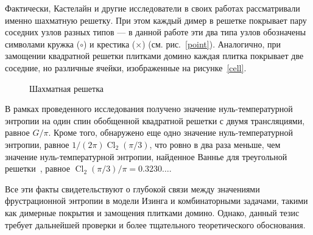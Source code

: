 \documentclass[utf8,12pt]{jetp}
\DeclareMathOperator{\Cl}{Cl}
\begin{document}
Фактически, Кастелайн и другие исследователи в своих работах рассматривали именно шахматную решетку. При этом каждый димер в решетке покрывает пару соседних узлов разных типов — в данной работе эти два типа узлов обозначены символами кружка ($\circ$) и крестика ($\times$) (см. рис.~\ref{point}). Аналогично, при замощении квадратной решетки плитками домино каждая плитка покрывает две соседние, но различные ячейки, изображенные на рисунке~\ref{cell}.

\begin{figure}[h]
	\caption{Шахматная решетка}
	\label{chessLattice}
\end{figure}

В рамках проведенного исследования получено значение нуль-температурной энтропии на один спин обобщенной квадратной решетки с двумя трансляциями, равное $G/\pi$. Кроме того, обнаружено еще одно значение нуль-температурной энтропии, равное $1/(2\pi)\Cl_2(\pi/3)$, что ровно в два раза меньше, чем значение нуль-температурной энтропии, найденное Ваннье для треугольной решетки~\cite{wannier1950}, равное $\Cl_2(\pi/3)/\pi = 0.3230\dots$.

Все эти факты свидетельствуют о глубокой связи между значениями фрустрационной энтропии в модели Изинга и комбинаторными задачами, такими как димерные покрытия и замощения плитками домино. Однако, данный тезис требует дальнейшей проверки и более тщательного теоретического обоснования.

%
\end{document}
